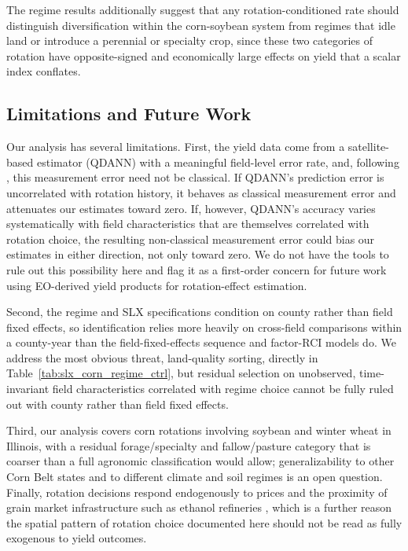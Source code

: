 \documentclass[12pt,letterpaper]{article}
\theoremstyle{remark}
\theoremstyle{remark}
\theoremstyle{plain}
\theoremstyle{definition}
\begin{document}
The regime results additionally suggest that any rotation-conditioned rate should distinguish diversification within the corn-soybean system from regimes that idle land or introduce a perennial or specialty crop, since these two categories of rotation have opposite-signed and economically large effects on yield that a scalar index conflates.

\subsection{\label{subsec:limitations}Limitations and Future Work}

Our analysis has several limitations. First, the yield data come from a satellite-based estimator (QDANN) with a meaningful field-level error rate, and, following \citet{Benami2026}, this measurement error need not be classical. If QDANN's prediction error is uncorrelated with rotation history, it behaves as classical measurement error and attenuates our estimates toward zero. If, however, QDANN's accuracy varies systematically with field characteristics that are themselves correlated with rotation choice, the resulting non-classical measurement error could bias our estimates in either direction, not only toward zero. We do not have the tools to rule out this possibility here and flag it as a first-order concern for future work using EO-derived yield products for rotation-effect estimation.

Second, the regime and SLX specifications condition on county rather than field fixed effects, so identification relies more heavily on cross-field comparisons within a county-year than the field-fixed-effects sequence and factor-RCI models do. We address the most obvious threat, land-quality sorting, directly in Table~\ref{tab:slx_corn_regime_ctrl}, but residual selection on unobserved, time-invariant field characteristics correlated with regime choice cannot be fully ruled out with county rather than field fixed effects.

Third, our analysis covers corn rotations involving soybean and winter wheat in Illinois, with a residual forage/specialty and fallow/pasture category that is coarser than a full agronomic classification would allow; generalizability to other Corn Belt states and to different climate and soil regimes is an open question. Finally, rotation decisions respond endogenously to prices and the proximity of grain market infrastructure such as ethanol refineries \citep{Pates2025,cheu2025}, which is a further reason the spatial pattern of rotation choice documented here should not be read as fully exogenous to yield outcomes.
\end{document}
